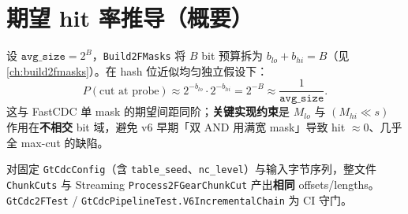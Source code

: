 \section{期望 hit 率推导（概要）}

设 $\texttt{avg\_size} = 2^B$，\texttt{Build2FMasks} 将 $B$ bit 预算拆为 $b_{lo} + b_{hi} = B$（见 \cref{ch:build2fmasks}）。在 hash 位近似均匀独立假设下：
\[
  P(\text{cut at probe}) \approx 2^{-b_{lo}} \cdot 2^{-b_{hi}} = 2^{-B} \approx \frac{1}{\texttt{avg\_size}}.
\]
这与 FastCDC 单 mask 的期望间距同阶；\textbf{关键实现约束}是 $M_{lo}$ 与 $(M_{hi} \ll s)$ 作用在\textbf{不相交} bit 域，避免 v6 早期「双 AND 用满宽 mask」导致 hit $\approx 0$、几乎全 max-cut 的缺陷。

\begin{invariantbox}
对固定 \texttt{GtCdcConfig}（含 \texttt{table\_seed}、\texttt{nc\_level}）与输入字节序列，整文件 \texttt{ChunkCuts} 与 Streaming \texttt{Process2FGearChunkCut} 产出\textbf{相同} offsets/lengths。\texttt{GtCdc2FTest} / \texttt{GtCdcPipelineTest.V6IncrementalChain} 为 CI 守门。
\end{invariantbox}
